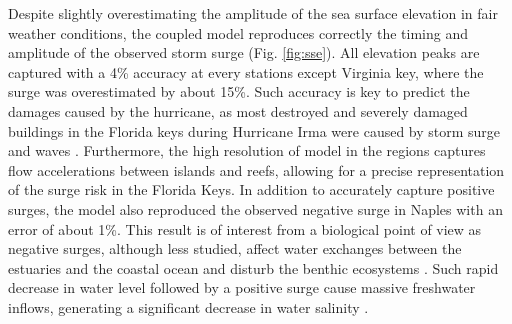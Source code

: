 \documentclass[preprint,12pt,authoryear]{elsarticle}
\begin{document}
Despite slightly overestimating the amplitude of the sea surface elevation in fair weather conditions, the coupled model reproduces correctly the timing and amplitude of the observed storm surge (Fig. \ref{fig:sse}). All elevation peaks are captured with a 4\% accuracy at every stations except Virginia key, where the surge was overestimated by about 15\%. Such accuracy is key to predict the damages caused by the hurricane, as most destroyed and severely damaged buildings in the Florida keys during Hurricane Irma were caused by storm surge and waves \citep{xian2018brief}. Furthermore, the high resolution of model in the regions captures flow accelerations between islands and reefs, allowing for a precise representation of the surge risk in the Florida Keys. In addition to accurately capture positive surges, the model also reproduced the observed negative surge in Naples with an error of about 1\%. This result is of interest from a biological point of view as negative surges, although less studied, affect water exchanges between the estuaries and the coastal ocean and disturb the benthic ecosystems \citep{liu2020impacts}. Such rapid decrease in water level followed by a positive surge cause massive freshwater inflows, generating a significant decrease in water salinity \citep{wachnicka2019hurricane}.
\end{document}
